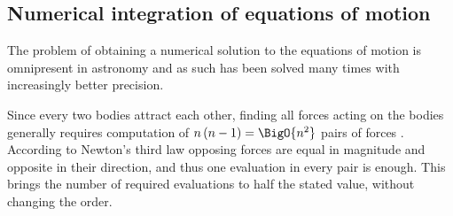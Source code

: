     \subsection{Numerical integration of equations of motion} \label{msi}
        The problem of obtaining a numerical solution to the equations of motion is omnipresent
        in astronomy and as such has been solved many times with increasingly better precision.

        Since every two bodies attract each other, finding all forces acting on the bodies generally
        requires computation of $n\left(n - 1\right) = \BigO{n^2}$ pairs of forces \cite{???}.
        According to Newton's third law opposing forces are equal in magnitude and opposite in their direction,
        and thus one evaluation in every pair is enough. This brings the number of required evaluations to half the stated value,
        without changing the order.

